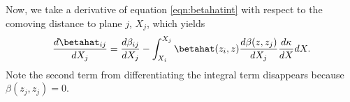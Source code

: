 Now, we take a derivative of equation \ref{eqn:betahatint} with respect to the comoving distance to plane $j$, $X_j$, which yields
\begin{equation}
\frac{d \betahat_{i j}}{d X_j} = \frac{d\beta_{i j}}{d X_j} - \int_{X_i}^{X_j} \betahat(z_i, z) \frac{d \beta(z, z_j)}{d X_j} \frac{d \kappa}{d X} d X. 
\end{equation}
Note the second term from differentiating the integral term disappears because $\beta(z_j, z_j) = 0$. 
  